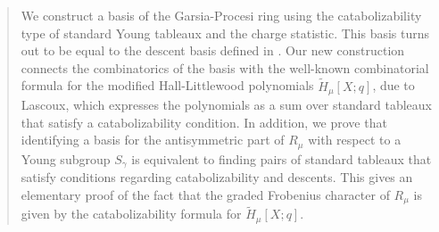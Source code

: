 \documentclass[ALCO, Unicode]{cedram}
\title
[A charge monomial basis of the Garsia-Procesi ring]
{A charge monomial basis of the Garsia-Procesi ring}
\author{\firstname{Mitsuki} \lastname{Hanada}}
\begin{document}
\begin{abstract}
We construct a basis of the Garsia-Procesi ring using the catabolizability type of standard Young tableaux and the charge statistic.  
This basis turns out to be equal to the descent basis defined in \cite{CC}.
Our new construction connects the combinatorics of the basis with the well-known combinatorial formula for the modified Hall-Littlewood polynomials $\tilde{H}_\mu[X;q]$, due to Lascoux, which expresses the polynomials as a sum over standard tableaux that satisfy a catabolizability condition. 
In addition, we prove that identifying a basis for the antisymmetric part of $R_{\mu}$ with respect to a Young subgroup $S_\gamma$ is equivalent to finding pairs of standard tableaux that satisfy conditions regarding catabolizability and descents. This gives an elementary proof of the fact that the graded Frobenius character of $R_{\mu}$ is given by the catabolizability formula for $\tilde{H}_\mu[X;q]$.
\end{abstract}

\maketitle

\theoremstyle{plain} 

\newtheorem*{thm1}{Theorem A}
\newtheorem*{thm2}{Theorem B}
\newtheorem*{prop2}{Proposition C}
\newtheorem*{cor3}{Corollary D}
\newtheorem{axio}[cdrthm]{Axiom}

\theoremstyle{definition}
\newtheorem{alg}[cdrthm]{Algorithm}
\newtheorem{ex}[cdrthm]{Example}

\theoremstyle{remark}
\end{document}
